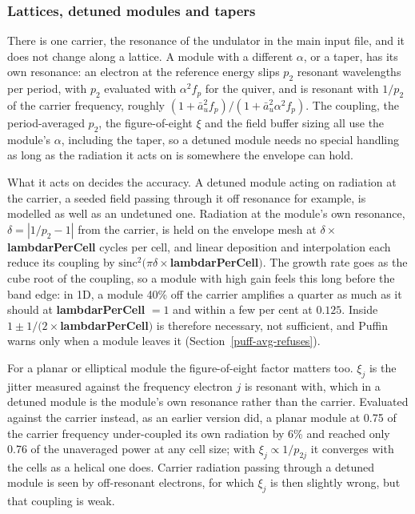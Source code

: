 \documentclass[12pt]{article}%
\begin{document}
\subsubsection{Lattices, detuned modules and tapers}

\label{puff-avg-latt}

There is one carrier, the resonance of the undulator in the main input file, and it does not change along a lattice. A module with a different $\alpha$, or a taper, has its own resonance: an electron at the reference energy slips $p_2$ resonant wavelengths per period, with $p_2$ evaluated with $\alpha^2 f_p$ for the quiver, and is resonant with $1/p_2$ of the carrier frequency, roughly $(1 + \bar{a}_u^2 f_p)/(1 + \bar{a}_u^2 \alpha^2 f_p)$. The coupling, the period-averaged $p_2$, the figure-of-eight $\xi$ and the field buffer sizing all use the module's $\alpha$, including the taper, so a detuned module needs no special handling as long as the radiation it acts on is somewhere the envelope can hold.

What it acts on decides the accuracy. A detuned module acting on radiation at the carrier, a seeded field passing through it off resonance for example, is modelled as well as an undetuned one. Radiation at the module's own resonance, $\delta = |1/p_2 - 1|$ from the carrier, is held on the envelope mesh at $\delta \times${\bf lambdarPerCell} cycles per cell, and linear deposition and interpolation each reduce its coupling by $\mathrm{sinc}^2(\pi \delta \times${\bf lambdarPerCell}$)$. The growth rate goes as the cube root of the coupling, so a module with high gain feels this long before the band edge: in 1D, a module 40\% off the carrier amplifies a quarter as much as it should at {\bf lambdarPerCell} $= 1$ and within a few per cent at $0.125$. Inside $1 \pm 1/(2\times${\bf lambdarPerCell}$)$ is therefore necessary, not sufficient, and Puffin warns only when a module leaves it (Section~\ref{puff-avg-refuses}).

For a planar or elliptical module the figure-of-eight factor matters too. $\xi_j$ is the jitter measured against the frequency electron $j$ is resonant with, which in a detuned module is the module's own resonance rather than the carrier. Evaluated against the carrier instead, as an earlier version did, a planar module at 0.75 of the carrier frequency under-coupled its own radiation by 6\% and reached only 0.76 of the unaveraged power at any cell size; with $\xi_j \propto 1/p_{2j}$ it converges with the cells as a helical one does. Carrier radiation passing through a detuned module is seen by off-resonant electrons, for which $\xi_j$ is then slightly wrong, but that coupling is weak.
\end{document}
